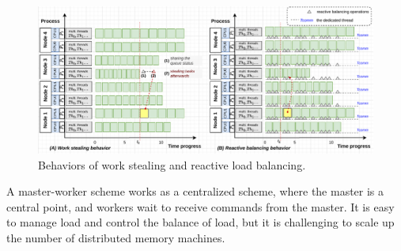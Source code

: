 \begin{figure}[t]
	\centering
	\includegraphics[scale=0.65]{./pictures/introduction/intro_motiv_workstealing_vs_reactlb.pdf}
	\caption{Behaviors of work stealing and reactive load balancing.}
	\label{fig:intro_motiv_workstealing_vs_reactlb}
\end{figure}

A master-worker scheme works as a centralized scheme, where the master is a central point, and workers wait to receive commands from the master. It is easy to manage load and control the balance of load, but it is challenging to scale up the number of distributed memory machines.\\


